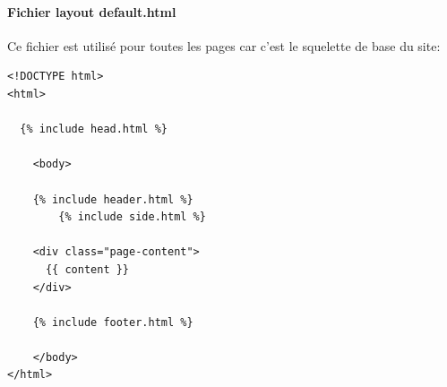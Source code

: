 \documentclass[11pt,a4paper,twoside]{report}
\begin{document}
			\paragraph{Fichier layout default.html}Ce fichier est utilisé pour toutes les pages car c'est le squelette de base du site:
				\lstset{caption=Fichier "default.html", language=HTML}
				\begin{lstlisting}
<!DOCTYPE html>
<html>

  {% include head.html %}

    <body>

    {% include header.html %}
        {% include side.html %}

    <div class="page-content">
      {{ content }}
    </div>

    {% include footer.html %}

    </body>
</html>

				\end{lstlisting}
\end{document}
